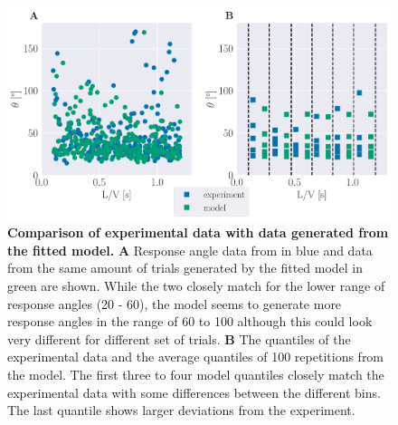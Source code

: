 \documentclass[a4paper,10pt,hidelinks]{scrreprt}
\begin{document}
    \begin{figure}[H]
    \begin{center}
    \includegraphics[width=\textwidth]{figure_expm_fit_comparison.pdf}
    \end{center}
    \caption{\textbf{Comparison of experimental data with data generated from the fitted model.} \textbf{A} Response angle data from \cite{Bhattacharyya2017} in blue and data from the same amount of trials generated by the fitted model in green are shown. While the two closely match for the lower range of response angles (20\textdegree{} - 60\textdegree{}), the model seems to generate more response angles in the range of 60\textdegree{} to 100\textdegree{} although this could look very different for different set of trials. \textbf{B} The quantiles of the experimental data and the average quantiles of 100 repetitions from the model. The first three to four model quantiles closely match the experimental data with some differences between the different bins. The last quantile shows larger deviations from the experiment.}
    \label{fig:fit_expm_comparison}
    \end{figure}
\end{document}
